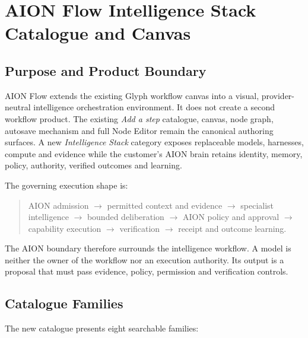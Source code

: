 \section{AION Flow Intelligence Stack Catalogue and Canvas}
\label{sec:aion-flow-intelligence-stack-catalogue}

\subsection{Purpose and Product Boundary}

AION Flow extends the existing Glyph workflow canvas into a visual, provider-neutral
intelligence orchestration environment.  It does not create a second workflow product.
The existing \emph{Add a step} catalogue, canvas, node graph, autosave mechanism and full
Node Editor remain the canonical authoring surfaces.  A new \emph{Intelligence Stack}
category exposes replaceable models, harnesses, compute and evidence while the customer's
AION brain retains identity, memory, policy, authority, verified outcomes and learning.

The governing execution shape is:

\begin{quote}
AION admission $\rightarrow$ permitted context and evidence $\rightarrow$ specialist
intelligence $\rightarrow$ bounded deliberation $\rightarrow$ AION policy and approval
$\rightarrow$ capability execution $\rightarrow$ verification $\rightarrow$ receipt and
outcome learning.
\end{quote}

The AION boundary therefore surrounds the intelligence workflow.  A model is neither the
owner of the workflow nor an execution authority.  Its output is a proposal that must pass
evidence, policy, permission and verification controls.

\subsection{Catalogue Families}

The new catalogue presents eight searchable families:

